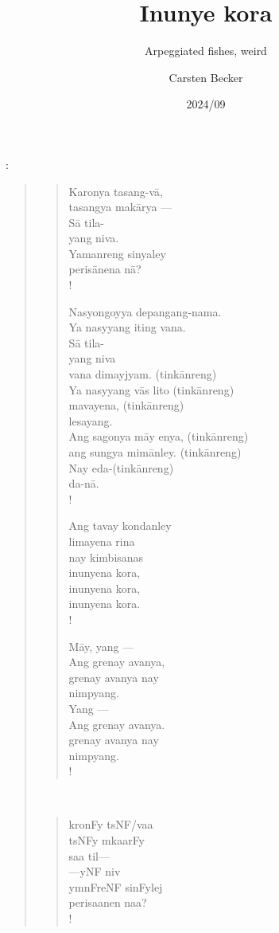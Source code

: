 \documentclass[12pt,paper=a4]{scrartcl}
\author{Carsten Becker}
\title{Inunye kora}
\subtitle{Arpeggiated fishes, weird}
\date{2024/09} %
\newenvironment{mytitle}{
	\hfill
	\begin{minipage}{0.667\textwidth}
	\vspace{\baselineskip}
	\begin{center}
		\Large
		\sffamily\bfseries
		\makeatletter
}{
		\makeatother
	\end{center}
	\vspace{1em}
	\end{minipage}
	\hfill
}
\begin{document}

\begin{mytitle}
	\@title: \@subtitle
\end{mytitle}

\begin{quote}
\begin{minipage}[t]{.5\linewidth}
\begin{verse}
\renewcommand*{\vrightskip}{-2em}
Karonya tasang-vā,\\
tasangya makārya ---\\
Sā tila-\\
yang niva.\\
Yamanreng sinyaley\\
perisānena nā?\\!

Nasyongoyya depangang-nama.\\
Ya nasyyang iting vana.\\
Sā tila-\\
yang niva\\
vana dimayjyam. (tinkānreng)\\
Ya nasyyang vās lito (tinkānreng)\\
mavayena, (tinkānreng)\\
lesayang.\\
Ang sagonya māy enya, (tinkānreng)\\
ang sungya mimānley. (tinkānreng)\\
Nay eda-(tinkānreng)\\
da-nā.\\!

Ang tavay kondanley\\
limayena rina\\
nay kimbisanas\\
inunyena kora,\\
inunyena kora,\\
inunyena kora.\\!

Māy, yang ---\\
Ang grenay avanya,\\
grenay avanya nay\\
nimpyang.\\
Yang ---\\
Ang grenay avanya.\\
grenay avanya nay\\
nimpyang.\\!
\end{verse}
\end{minipage}
~
\begin{minipage}[t]{.5\linewidth}
\Tagati %
\begin{verse}
kronFy tsNF/vaa\\
tsNFy mkaarFy\\
saa til—\\
—yNF niv\\
ymnFreNF sinFylej\\
perisaanen naa?\\!


\end{verse}
\end{minipage}
\end{quote}
\end{document}
